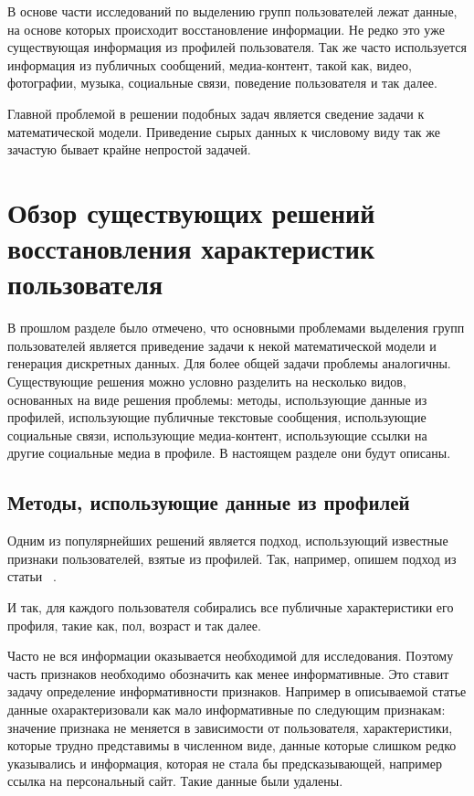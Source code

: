 \documentclass[annotation,times,page4]{itmo-student-thesis}
\begin{document}
В основе части исследований по выделению групп пользователей лежат данные, на основе которых происходит восстановление информации. Не редко это уже существующая информация из профилей пользователя. Так же часто используется информация из публичных сообщений, медиа-контент, такой как, видео, фотографии, музыка, социальные связи, поведение пользователя и так далее.

Главной проблемой в решении подобных задач является сведение задачи к математической модели. Приведение сырых данных к числовому виду так же зачастую бывает крайне непростой задачей.
  
\section{Обзор существующих решений восстановления характеристик пользователя}
В прошлом разделе было отмечено, что основными проблемами выделения групп пользователей является приведение задачи к некой математической модели и генерация дискретных данных. Для более общей задачи проблемы аналогичны. Существующие решения можно условно разделить на несколько видов, основанных на виде решения проблемы: методы, использующие данные из профилей, использующие публичные текстовые сообщения, использующие социальные связи, использующие медиа-контент, использующие ссылки на другие социальные медиа в профиле. В настоящем разделе они будут описаны.
\subsection{Методы, использующие данные из профилей}
Одним из популярнейших решений является подход, использующий известные признаки пользователей, взятые из профилей. Так, например, опишем подход из статьи ~\cite{golbeck2011predicting}. 

И так, для каждого пользователя собирались все публичные характеристики его профиля, такие как, пол, возраст и так далее. 

Часто не вся информации оказывается необходимой для исследования. Поэтому часть признаков необходимо обозначить как менее информативные. Это ставит задачу определение информативности признаков. Например в описываемой статье данные охарактеризовали как мало информативные по следующим признакам: значение признака не меняется в зависимости от пользователя, характеристики, которые трудно представимы в численном виде, данные которые слишком редко указывались и информация, которая не стала бы предсказывающей, например ссылка на персональный сайт. Такие данные были удалены.
 
\end{document}
